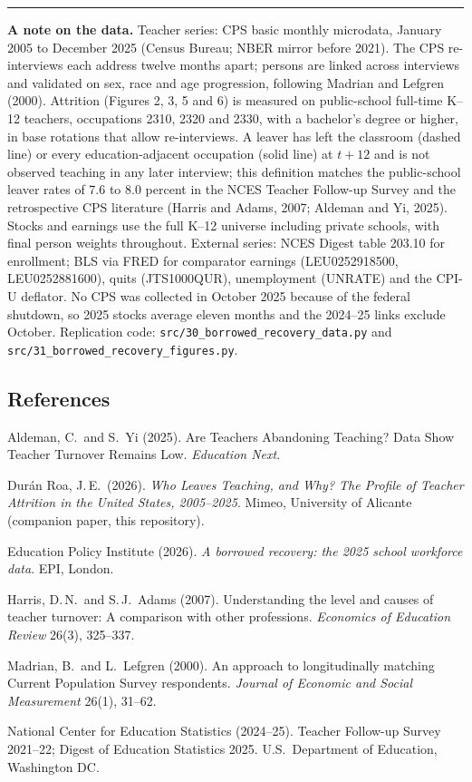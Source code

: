 \documentclass[11pt,a4paper]{article}
\begin{document}
\vspace{14pt}
\noindent\rule{\linewidth}{0.5pt}

{\footnotesize\textbf{A note on the data.} Teacher series: CPS basic
monthly microdata, January 2005 to December 2025 (Census Bureau; NBER
mirror before 2021). The CPS re-interviews each address twelve months
apart; persons are linked across interviews and validated on sex, race
and age progression, following Madrian and Lefgren (2000). Attrition
(Figures 2, 3, 5 and 6) is measured on public-school full-time K--12
teachers, occupations 2310, 2320 and 2330, with a bachelor's degree or
higher, in base rotations that allow re-interviews. A leaver has left the
classroom (dashed line) or every education-adjacent occupation (solid
line) at $t{+}12$ and is not observed teaching in any later interview;
this definition matches the public-school leaver rates of 7.6 to 8.0
percent in the NCES Teacher Follow-up Survey and the retrospective CPS
literature (Harris and Adams, 2007; Aldeman and Yi, 2025). Stocks and
earnings use the full K--12 universe including private schools, with
final person weights throughout. External series: NCES Digest table
203.10 for enrollment; BLS via FRED for comparator earnings
(LEU0252918500, LEU0252881600), quits (JTS1000QUR), unemployment (UNRATE)
and the CPI-U deflator. No CPS was collected in October 2025 because of
the federal shutdown, so 2025 stocks average eleven months and the
2024--25 links exclude October. Replication code:
\texttt{src/30\_borrowed\_recovery\_data.py} and
\texttt{src/31\_borrowed\_recovery\_figures.py}.}

\subsection*{References}
{\small
\hangindent=14pt Aldeman, C.\ and S.\ Yi (2025). Are Teachers Abandoning
Teaching? Data Show Teacher Turnover Remains Low. \emph{Education Next}.

\hangindent=14pt Durán Roa, J.\,E.\ (2026). \emph{Who Leaves Teaching, and
Why? The Profile of Teacher Attrition in the United States, 2005--2025}.
Mimeo, University of Alicante (companion paper, this repository).

\hangindent=14pt Education Policy Institute (2026). \emph{A borrowed
recovery: the 2025 school workforce data}. EPI, London.

\hangindent=14pt Harris, D.\,N.\ and S.\,J.\ Adams (2007). Understanding
the level and causes of teacher turnover: A comparison with other
professions. \emph{Economics of Education Review} 26(3), 325--337.

\hangindent=14pt Madrian, B.\ and L.\ Lefgren (2000). An approach to
longitudinally matching Current Population Survey respondents.
\emph{Journal of Economic and Social Measurement} 26(1), 31--62.

\hangindent=14pt National Center for Education Statistics (2024--25).
Teacher Follow-up Survey 2021--22; Digest of Education Statistics 2025.
U.S.\ Department of Education, Washington DC.
}
\end{document}
